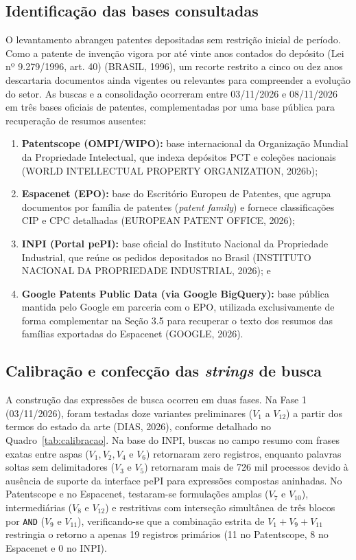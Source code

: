 \documentclass[12pt,a4paper]{article}
\begin{document}
\subsection{Identificação das bases consultadas}
O levantamento abrangeu patentes depositadas sem restrição inicial de período. Como a patente de invenção vigora por até vinte anos contados do depósito (Lei nº 9.279/1996, art. 40) (BRASIL, 1996), um recorte restrito a cinco ou dez anos descartaria documentos ainda vigentes ou relevantes para compreender a evolução do setor. As buscas e a consolidação ocorreram entre 03/11/2026 e 08/11/2026 em três bases oficiais de patentes, complementadas por uma base pública para recuperação de resumos ausentes:
\begin{enumerate}
    \item \textbf{Patentscope (OMPI/WIPO):} base internacional da Organização Mundial da Propriedade Intelectual, que indexa depósitos PCT e coleções nacionais (WORLD INTELLECTUAL PROPERTY ORGANIZATION, 2026b);
    \item \textbf{Espacenet (EPO):} base do Escritório Europeu de Patentes, que agrupa documentos por família de patentes (\textit{patent family}) e fornece classificações CIP e CPC detalhadas (EUROPEAN PATENT OFFICE, 2026);
    \item \textbf{INPI (Portal pePI):} base oficial do Instituto Nacional da Propriedade Industrial, que reúne os pedidos depositados no Brasil (INSTITUTO NACIONAL DA PROPRIEDADE INDUSTRIAL, 2026); e
    \item \textbf{Google Patents Public Data (via Google BigQuery):} base pública mantida pelo Google em parceria com o EPO, utilizada exclusivamente de forma complementar na Seção 3.5 para recuperar o texto dos resumos das famílias exportadas do Espacenet (GOOGLE, 2026).
\end{enumerate}

\subsection{Calibração e confecção das \textit{strings} de busca}
A construção das expressões de busca ocorreu em duas fases. Na Fase 1 (03/11/2026), foram testadas doze variantes preliminares ($V_1$ a $V_{12}$) a partir dos termos do estado da arte (DIAS, 2026), conforme detalhado no Quadro~\ref{tab:calibracao}. Na base do INPI, buscas no campo resumo com frases exatas entre aspas ($V_1, V_2, V_4$ e $V_6$) retornaram zero registros, enquanto palavras soltas sem delimitadores ($V_3$ e $V_5$) retornaram mais de 726 mil processos devido à ausência de suporte da interface pePI para expressões compostas aninhadas. No Patentscope e no Espacenet, testaram-se formulações amplas ($V_7$ e $V_{10}$), intermediárias ($V_8$ e $V_{12}$) e restritivas com interseção simultânea de três blocos por \texttt{AND} ($V_9$ e $V_{11}$), verificando-se que a combinação estrita de $V_1 + V_9 + V_{11}$ restringia o retorno a apenas 19 registros primários (11 no Patentscope, 8 no Espacenet e 0 no INPI).
\end{document}
